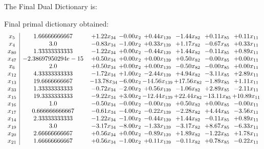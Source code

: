 \documentclass[8pt]{article}
\begin{document}
The Final Dual Dictionary is: 

 Final primal dictionary obtained: 
\[\begin{array}{c| c c@{\hskip 2pt} c@{\hskip 2pt} c@{\hskip 2pt} c@{\hskip 2pt} c@{\hskip 2pt} c@{\hskip 2pt} }
 x_{5}   &  1.66666666667 & +  1.22 x_{34} & -0.00 x_{2} & +  0.44 x_{139} & -1.44 x_{82} & +  0.11 x_{85} & +  0.11 x_{11}\\
 x_{4}   &  3.0 & -0.83 x_{34} & -1.00 x_{2} & +  0.33 x_{139} & +  1.17 x_{82} & -0.67 x_{85} & +  0.33 x_{11}\\
 x_{80}   &  1.33333333333 & -1.22 x_{34} & +  0.00 x_{2} & -0.44 x_{139} & +  1.44 x_{82} & -0.11 x_{85} & +  0.89 x_{11}\\
 x_{47}   &  -2.38697950294e-15 & +  0.50 x_{34} & +  0.00 x_{2} & +  0.00 x_{139} & +  0.50 x_{82} & -0.00 x_{85} & +  0.00 x_{11}\\
 x_{6}   &  2.0 & +  0.50 x_{34} & +  0.00 x_{2} & +  0.00 x_{139} & -0.50 x_{82} & -0.00 x_{85} & +  0.00 x_{11}\\
 x_{12}   &  4.33333333333 & -1.72 x_{34} & +  1.00 x_{2} & -2.44 x_{139} & +  4.94 x_{82} & -3.11 x_{85} & +  2.89 x_{11}\\
 x_{13}   &  19.6666666667 & -13.78 x_{34} & -6.00 x_{2} & -14.56 x_{139} & + 17.56 x_{82} & -1.89 x_{85} & +  1.11 x_{11}\\
 x_{33}   &  1.33333333333 & -0.72 x_{34} & -2.00 x_{2} & +  0.56 x_{139} & -1.06 x_{82} & +  2.89 x_{85} & -2.11 x_{11}\\
 x_{15}   &  19.3333333333 & -9.22 x_{34} & +  3.00 x_{2} & -12.44 x_{139} & + 22.44 x_{82} & -13.11 x_{85} & + 10.89 x_{11}\\
 x_{16}   &  1.0 & -0.50 x_{34} & -0.00 x_{2} & -0.00 x_{139} & +  0.50 x_{82} & +  0.00 x_{85} & -0.00 x_{11}\\
 x_{17}   &  0.666666666667 & -0.61 x_{34} & -4.00 x_{2} & -0.22 x_{139} & -2.28 x_{82} & +  4.44 x_{85} & -3.56 x_{11}\\
 x_{14}   &  2.33333333333 & -1.22 x_{34} & -1.00 x_{2} & -0.44 x_{139} & +  1.44 x_{82} & -0.11 x_{85} & +  0.89 x_{11}\\
 x_{19}   &  3.0 & -3.17 x_{34} & -8.00 x_{2} & -1.33 x_{139} & -3.17 x_{82} & +  8.67 x_{85} & -6.33 x_{11}\\
 x_{20}   &  2.66666666667 & +  0.56 x_{34} & +  0.00 x_{2} & -0.89 x_{139} & +  1.89 x_{82} & -1.22 x_{85} & +  1.78 x_{11}\\
 x_{21}   &  1.66666666667 & +  0.56 x_{34} & -1.00 x_{2} & +  0.11 x_{139} & -0.11 x_{82} & +  0.78 x_{85} & -0.22 x_{11}\\

\end{array}\]
\end{document}
